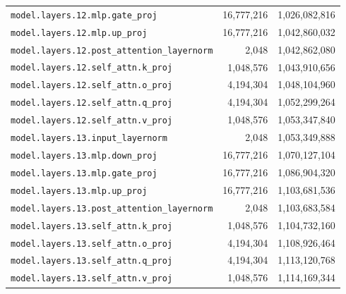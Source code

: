 \documentclass[10pt,a4paper]{article}
\theoremstyle{definition}
\begin{document}
\begin{appendices}
\begin{longtable}{p{9.5cm}rr}
\texttt{model.\allowbreak{}layers.\allowbreak{}12.\allowbreak{}mlp.\allowbreak{}gate\_proj} & 16,777,216 & 1,026,082,816 \\
\texttt{model.\allowbreak{}layers.\allowbreak{}12.\allowbreak{}mlp.\allowbreak{}up\_proj} & 16,777,216 & 1,042,860,032 \\
\texttt{model.\allowbreak{}layers.\allowbreak{}12.\allowbreak{}post\_attention\_layernorm} & 2,048 & 1,042,862,080 \\
\texttt{model.\allowbreak{}layers.\allowbreak{}12.\allowbreak{}self\_attn.\allowbreak{}k\_proj} & 1,048,576 & 1,043,910,656 \\
\texttt{model.\allowbreak{}layers.\allowbreak{}12.\allowbreak{}self\_attn.\allowbreak{}o\_proj} & 4,194,304 & 1,048,104,960 \\
\texttt{model.\allowbreak{}layers.\allowbreak{}12.\allowbreak{}self\_attn.\allowbreak{}q\_proj} & 4,194,304 & 1,052,299,264 \\
\texttt{model.\allowbreak{}layers.\allowbreak{}12.\allowbreak{}self\_attn.\allowbreak{}v\_proj} & 1,048,576 & 1,053,347,840 \\
\texttt{model.\allowbreak{}layers.\allowbreak{}13.\allowbreak{}input\_layernorm} & 2,048 & 1,053,349,888 \\
\texttt{model.\allowbreak{}layers.\allowbreak{}13.\allowbreak{}mlp.\allowbreak{}down\_proj} & 16,777,216 & 1,070,127,104 \\
\texttt{model.\allowbreak{}layers.\allowbreak{}13.\allowbreak{}mlp.\allowbreak{}gate\_proj} & 16,777,216 & 1,086,904,320 \\
\texttt{model.\allowbreak{}layers.\allowbreak{}13.\allowbreak{}mlp.\allowbreak{}up\_proj} & 16,777,216 & 1,103,681,536 \\
\texttt{model.\allowbreak{}layers.\allowbreak{}13.\allowbreak{}post\_attention\_layernorm} & 2,048 & 1,103,683,584 \\
\texttt{model.\allowbreak{}layers.\allowbreak{}13.\allowbreak{}self\_attn.\allowbreak{}k\_proj} & 1,048,576 & 1,104,732,160 \\
\texttt{model.\allowbreak{}layers.\allowbreak{}13.\allowbreak{}self\_attn.\allowbreak{}o\_proj} & 4,194,304 & 1,108,926,464 \\
\texttt{model.\allowbreak{}layers.\allowbreak{}13.\allowbreak{}self\_attn.\allowbreak{}q\_proj} & 4,194,304 & 1,113,120,768 \\
\texttt{model.\allowbreak{}layers.\allowbreak{}13.\allowbreak{}self\_attn.\allowbreak{}v\_proj} & 1,048,576 & 1,114,169,344 \\

\end{longtable}
\end{appendices}
\end{document}

